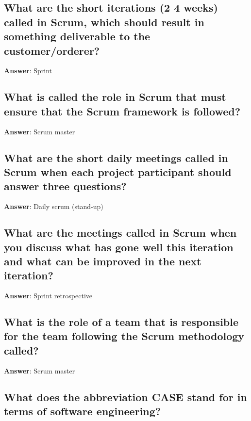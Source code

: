 \documentclass[a4paper,11pt,oneside]{article}
\begin{document}
\begin{sloppypar}
\subsection{What are the short iterations (2 {\textendash} 4 weeks) called in Scrum, which should result in something deliverable to the customer/orderer?}

\label{q:42:sa:en:True}

\textbf{Answer}: Sprint



\subsection{What is called the role in Scrum that must ensure that the Scrum framework is followed?}

\label{q:43:sa:en:True}

\textbf{Answer}: Scrum master



\subsection{What are the short daily meetings called in Scrum when each project participant should answer three questions?}

\label{q:44:sa:en:True}

\textbf{Answer}: Daily scrum (stand-up)



\subsection{What are the meetings called in Scrum when you discuss what has gone well this iteration and what can be improved in the next iteration?}

\label{q:45:sa:en:True}

\textbf{Answer}: Sprint retrospective



\subsection{What is the role of a team that is responsible for the team following the Scrum methodology called?}

\label{q:46:sa:en:True}

\textbf{Answer}: Scrum master



\subsection{What does the abbreviation CASE stand for in terms of software engineering?}


\end{sloppypar}
\end{document}
